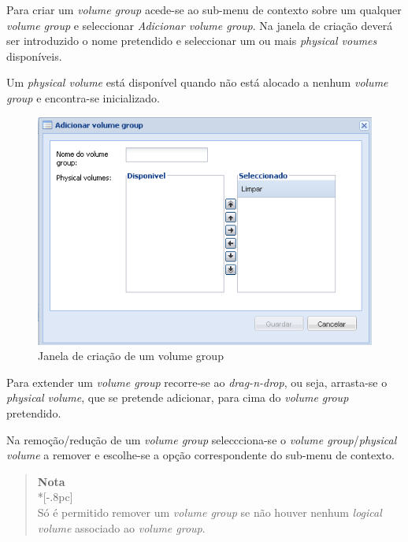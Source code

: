 Para criar um \emph{volume group} acede-se ao sub-menu de contexto sobre um qualquer \emph{volume group} e seleccionar \emph{Adicionar volume group}.
Na janela de criação deverá ser introduzido o nome pretendido e seleccionar um ou mais \emph{physical voumes} disponíveis.

Um \emph{physical volume} está disponível quando não está alocado a nenhum \emph{volume group} e encontra-se inicializado.

\begin{figure}[H]
        \begin{center}
        \includegraphics[scale=0.5]{screenshots/storage_vg_create.png}
        \caption{Janela de criação de um volume group}
        \label{fig:storage_vg_create}
        \end{center}
\end{figure}

Para extender um \emph{volume group} recorre-se ao \emph{drag-n-drop}, ou seja, arrasta-se o \emph{physical volume}, que se pretende adicionar, para cima do \emph{volume group} pretendido.

Na remoção/redução de um \emph{volume group} seleccciona-se o \emph{volume group}/\emph{physical volume} a remover e escolhe-se a opção correspondente do sub-menu de contexto.
\begin{quote}
	{\large \bf Nota} \\*[-.8pc]
	\underline{\hspace{6in}} \\
	Só é permitido remover um \emph{volume group} se não houver nenhum \emph{logical volume} associado ao \emph{volume group}.
\end{quote}
 
